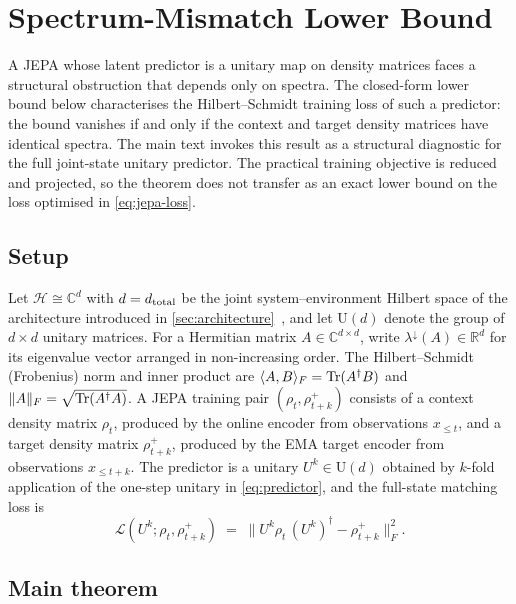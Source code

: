 \section{Spectrum-Mismatch Lower Bound}\label{sec:theorem}

A JEPA whose latent predictor is a unitary map on density matrices faces
a structural obstruction that depends only on spectra. The closed-form
lower bound below characterises the Hilbert--Schmidt training loss of
such a predictor: the bound vanishes if and only if the context and
target density matrices have identical spectra. The main text invokes
this result as a structural diagnostic for the full joint-state unitary
predictor. The practical training objective is reduced and projected,
so the theorem does not transfer as an exact lower bound on the loss
optimised in \cref{eq:jepa-loss}.

\subsection{Setup}\label{sec:theorem-setup}

Let $\mathcal{H} \cong \mathbb{C}^{d}$ with $d = d_{\text{total}}$ be the joint
system--environment Hilbert space of the architecture introduced in
\cref{sec:architecture}~\cite{nielsen2010quantum,breuer2002theory}, and let $\mathrm{U}(d)$ denote the group of
$d \times d$ unitary matrices. For a Hermitian matrix $A \in \mathbb{C}^{d
\times d}$, write $\lambda^{\downarrow}(A) \in \mathbb{R}^{d}$ for its
eigenvalue vector arranged in non-increasing order. The
Hilbert--Schmidt (Frobenius) norm and inner product are
$\langle A, B \rangle_{F} = \operatorname{Tr}(A^{\dagger} B)$ and
$\lVert A \rVert_{F} = \sqrt{\operatorname{Tr}(A^{\dagger} A)}$.
A JEPA training pair $(\rho_{t}, \rho_{t+k}^{+})$ consists of a context
density matrix $\rho_{t}$, produced by the online encoder from observations
$x_{\leq t}$, and a target density matrix $\rho_{t+k}^{+}$, produced by the
EMA target encoder from observations $x_{\leq t+k}$. The predictor is a
unitary $U^{k} \in \mathrm{U}(d)$ obtained by $k$-fold application of the
one-step unitary in \cref{eq:predictor}, and the full-state matching loss is
\begin{equation}\label{eq:jepa-loss-main}
  \mathcal{L}(U^{k}; \rho_{t}, \rho_{t+k}^{+})
  \;=\;
  \bigl\lVert U^{k} \rho_{t}\, (U^{k})^{\dagger}
              - \rho_{t+k}^{+} \bigr\rVert_{F}^{2} .
\end{equation}

\subsection{Main theorem}\label{sec:theorem-main}

